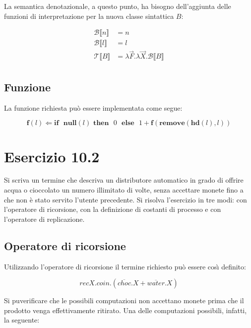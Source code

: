 		La semantica denotazionale, a questo punto, ha bisogno dell'aggiunta delle funzioni di interpretazione per la nuova classe sintattica $B$:
		
		\begin{align*}
		\mathcal{B} \llbracket n \rrbracket & = n\\
		\mathcal{B} \llbracket l \rrbracket & = l\\
		\mathcal{T} \llbracket B \rrbracket & = \lambda \overrightarrow{F}.\lambda \overrightarrow{X}.\mathcal{B} \llbracket B \rrbracket\\		
		\end{align*}
		
		\subsection{Funzione}
		\qquad La funzione richiesta pu\`o essere implementata come segue:
		
		$$\textbf{f}(l) \Leftarrow \textbf{if}\text{ }\textbf{null}(l)\text{
		}\textbf{then}\text{ }0\text{ }\textbf{else}\text{ }1 +
		\textbf{f}(\textbf{remove}(\textbf{hd}(l),l))$$
		
		\newpage
		
	\section{Esercizio 10.2}
		\qquad Si scriva un termine che descriva un distributore automatico in grado
		di offrire acqua o cioccolato un numero illimitato di volte, senza accettare
		monete fino a che non \`e stato servito l'utente precedente. Si risolva
		l'esercizio in tre modi: con l'operatore di ricorsione, con la definizione di
		costanti di processo e con l'operatore di replicazione.
		
		\sectionline
		
		\subsection{Operatore di ricorsione}
		
		\qquad Utilizzando l'operatore di ricorsione il termine richiesto pu\`{o} essere cos\`{\i} definito:
		
		$$recX.coin.(\overline{choc}.X + \overline{water}.X)$$
		
		Si pu\oacc verificare che le possibili computazioni non accettano monete prima che il prodotto venga effettivamente ritirato. Una delle computazioni possibili, infatti, \eacc la seguente:
		
